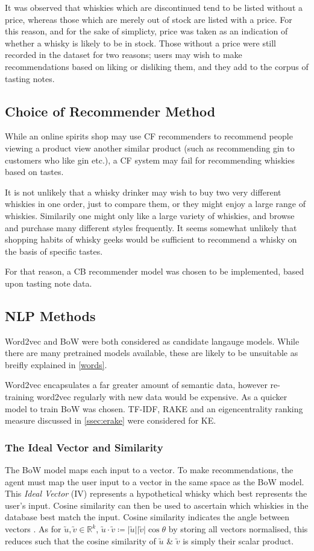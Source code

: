 It was observed that whiskies which are discontinued tend to be listed
without a price, whereas those which are merely out of stock are listed with a
price.  For this reason, and for the sake of simplicty, price was taken as an
indication of whether a whisky is likely to be in stock.  Those without a price
were still recorded in the dataset for two reasons; users may wish to make recommendations
based on liking or disliking them, and they add to the corpus of tasting notes.

\subsection{Choice of Recommender Method}
While an online spirits shop may use CF recommenders to recommend people viewing a product view another
similar product (such as recommending gin to customers who like gin etc.), a CF system may fail for
recommending whiskies based on tastes.

It is not unlikely that a whisky drinker may wish to buy two very different whiskies in one order, just 
to compare them, or they might enjoy a large range of whiskies. Similarily one might only like a large
variety of whiskies, and browse and purchase many different styles frequently. 
It seems somewhat unlikely that shopping habits of whisky geeks would be sufficient to recommend a whisky
on the basis of specific tastes.

For that reason, a CB recommender model was chosen to be implemented, based upon tasting note data.

\subsection{NLP Methods}\label{whiskylang}
Word2vec and BoW were both considered as candidate langauge models. While there are
many pretrained models available, these are likely to be unsuitable as breifly
explained in \autoref{words}.

Word2vec encapsulates a far greater amount of semantic data, however re-training
word2vec regularly with new data would be expensive. As a quicker model to train
BoW was chosen.  TF-IDF, RAKE and an eigencentrality ranking measure discussed in 
\autoref{ssec:erake} were considered for KE.

\subsubsection{The Ideal Vector and Similarity}\label{sssec:cossim}
The BoW model maps each input to a vector. To make recommendations, the agent must
map the user input to a vector in the same space as the BoW model. This
\emph{Ideal Vector} (IV) represents a hypothetical whisky which best represents 
the user's input. Cosine similarity can then be used to ascertain which whiskies in 
the database best match the input.  Cosine similarity indicates the angle between
vectors \cite{Melville2010}. As for $\utilde{u}, \utilde{v}\in \mathbb{R} ^{k}$, 
$\utilde{u} \cdot \utilde{v} \coloneqq \vert \utilde{u} \vert \vert \utilde{v} \vert \cos{\theta}$
by storing all vectors normalised, this reduces such that the cosine similarity of
$\utilde{u}$ \& $\utilde{v}$ is simply their scalar product.

